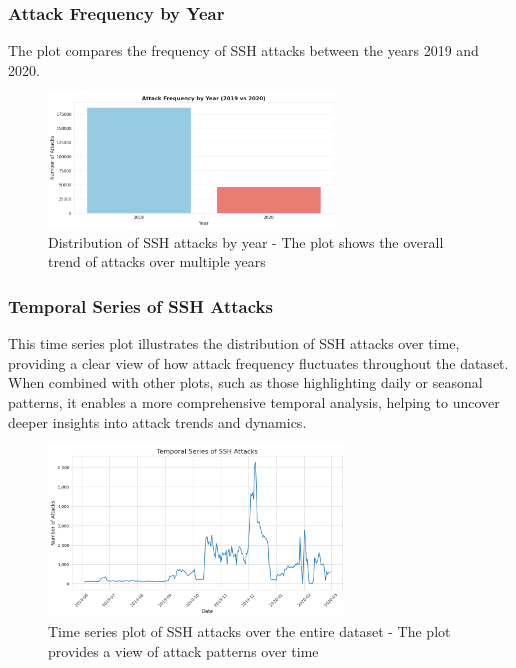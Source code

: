         \subsubsection{Attack Frequency by Year \\}
        
            The plot compares the frequency of SSH attacks between the years 2019 and 2020.
            
            \vspace{-0.05cm}

            \begin{figure}[H]
                \centering
                \includegraphics[width=0.68\textwidth]{../figures/plots/section1/attack_frequency_by_year.png}
                \caption{Distribution of SSH attacks by year - The plot shows the overall trend of attacks over multiple years}
                \label{fig:attack_frequency_by_year}
            \end{figure}
            
        \subsubsection{Temporal Series of SSH Attacks \\}
        
            This time series plot illustrates the distribution of SSH attacks over time, providing a clear view of how attack frequency fluctuates throughout the dataset. When combined with other plots, such as those highlighting daily or seasonal patterns, it enables a more comprehensive temporal analysis, helping to uncover deeper insights into attack trends and dynamics.

            \begin{figure}[H]
                \centering
                \includegraphics[width=0.7\textwidth]{../figures/plots/section1/temporal_series_of_ssh_attacks.png}
                \caption{Time series plot of SSH attacks over the entire dataset - The plot provides a view of attack patterns over time}
                \label{fig:temporal_series_of_ssh_attacks}
            \end{figure}

